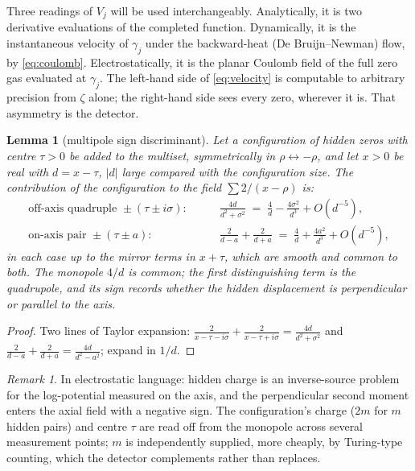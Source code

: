 \documentclass[11pt]{amsart}
\newtheorem{lemma}[theorem]{Lemma}
\theoremstyle{remark}
\newtheorem{remark}[theorem]{Remark}
\begin{document}
Three readings of $V_j$ will be used interchangeably. Analytically, it is two derivative evaluations of the completed function. Dynamically, it is the instantaneous velocity of $\gamma_j$ under the backward-heat (De Bruijn--Newman) flow, by \eqref{eq:coulomb}. Electrostatically, it is the planar Coulomb field of the full zero gas evaluated at $\gamma_j$. The left-hand side of \eqref{eq:velocity} is computable to arbitrary precision from $\zeta$ alone; the right-hand side sees every zero, wherever it is. That asymmetry is the detector.

\begin{lemma}[multipole sign discriminant]\label{lem:multipole}
Let a configuration of hidden zeros with centre $\tau>0$ be added to the multiset, symmetrically in $\rho\leftrightarrow-\rho$, and let $x>0$ be real with $d=x-\tau$, $|d|$ large compared with the configuration size. The contribution of the configuration to the field $\sum 2/(x-\rho)$ is:
\begin{align*}
\text{off-axis quadruple } \pm(\tau\pm i\sigma):&\qquad
\frac{4d}{d^2+\sigma^2} \;=\; \frac{4}{d}-\frac{4\sigma^2}{d^3}+O(d^{-5}),\\[2pt]
\text{on-axis pair } \pm(\tau\pm a):&\qquad
\frac{2}{d-a}+\frac{2}{d+a} \;=\; \frac{4}{d}+\frac{4a^2}{d^3}+O(d^{-5}),
\end{align*}
in each case up to the mirror terms in $x+\tau$, which are smooth and common to both. The monopole $4/d$ is common; the first distinguishing term is the quadrupole, and its \emph{sign} records whether the hidden displacement is perpendicular or parallel to the axis.
\end{lemma}

\begin{proof}
Two lines of Taylor expansion: $\tfrac{2}{x-\tau-i\sigma}+\tfrac{2}{x-\tau+i\sigma}=\tfrac{4d}{d^2+\sigma^2}$ and $\tfrac{2}{d-a}+\tfrac{2}{d+a}=\tfrac{4d}{d^2-a^2}$; expand in $1/d$.
\end{proof}

\begin{remark}
In electrostatic language: hidden charge is an inverse-source problem for the log-potential measured on the axis, and the perpendicular second moment enters the axial field with a negative sign. The configuration's charge ($2m$ for $m$ hidden pairs) and centre $\tau$ are read off from the monopole across several measurement points; $m$ is independently supplied, more cheaply, by Turing-type counting, which the detector complements rather than replaces.
\end{remark}
\end{document}
